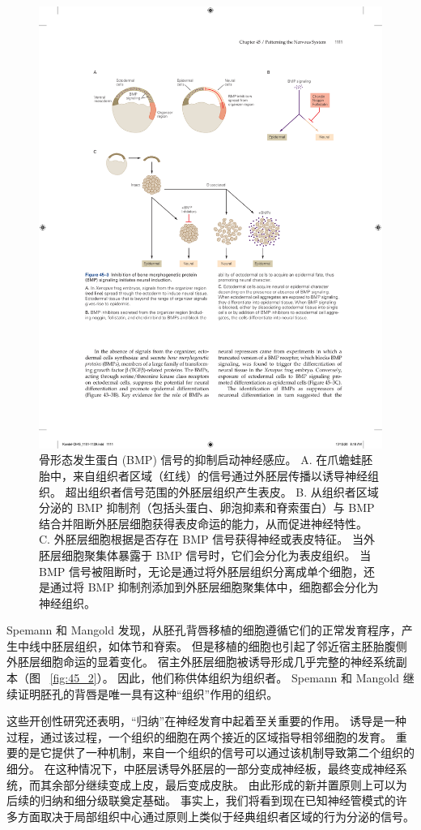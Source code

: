 \begin{figure}[htbp]
	\centering
	\includegraphics[width=0.9\linewidth]{chap45/fig_45_3}
	\caption{骨形态发生蛋白 (BMP) 信号的抑制启动神经感应。 A. 在爪蟾蛙胚胎中，来自组织者区域（红线）的信号通过外胚层传播以诱导神经组织。 超出组织者信号范围的外胚层组织产生表皮。 B. 从组织者区域分泌的 BMP 抑制剂（包括头蛋白、卵泡抑素和脊索蛋白）与 BMP 结合并阻断外胚层细胞获得表皮命运的能力，从而促进神经特性。 C. 外胚层细胞根据是否存在 BMP 信号获得神经或表皮特征。 当外胚层细胞聚集体暴露于 BMP 信号时，它们会分化为表皮组织。 当 BMP 信号被阻断时，无论是通过将外胚层组织分离成单个细胞，还是通过将 BMP 抑制剂添加到外胚层细胞聚集体中，细胞都会分化为神经组织。}
	\label{fig:45_3}
\end{figure}


Spemann 和 Mangold 发现，从胚孔背唇移植的细胞遵循它们的正常发育程序，产生中线中胚层组织，如体节和脊索。
但是移植的细胞也引起了邻近宿主胚胎腹侧外胚层细胞命运的显着变化。
宿主外胚层细胞被诱导形成几乎完整的神经系统副本（图 ~\ref{fig:45_2}）。
因此，他们称供体组织为组织者。
Spemann 和 Mangold 继续证明胚孔的背唇是唯一具有这种“组织”作用的组织。


这些开创性研究还表明，“归纳”在神经发育中起着至关重要的作用。
诱导是一种过程，通过该过程，一个组织的细胞在两个接近的区域指导相邻细胞的发育。
重要的是它提供了一种机制，来自一个组织的信号可以通过该机制导致第二个组织的细分。
在这种情况下，中胚层诱导外胚层的一部分变成神经板，最终变成神经系统，而其余部分继续变成上皮，最后变成皮肤。
由此形成的新并置原则上可以为后续的归纳和细分级联奠定基础。
事实上，我们将看到现在已知神经管模式的许多方面取决于局部组织中心通过原则上类似于经典组织者区域的行为分泌的信号。



